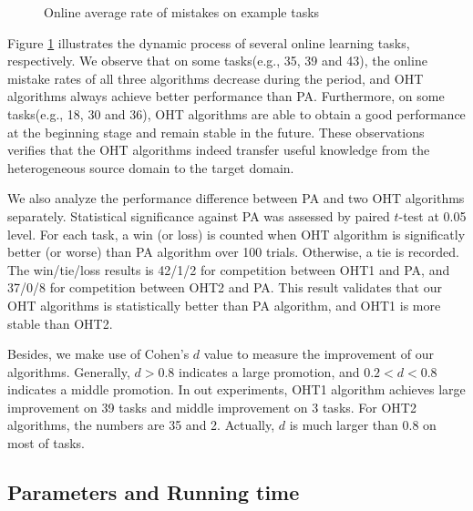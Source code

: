 \documentclass[twocolumn]{article}
\begin{document}
\begin{figure}[!htb]
\begin{center}
{  }
  \caption{Online average rate of mistakes on example tasks}
  \label{Online average rate of mistakes on example tasks}
\end{center}
\end{figure}

Figure \ref{Online average rate of mistakes on example tasks} illustrates the dynamic process of several online learning tasks, respectively.
We observe that on some tasks(e.g., 35, 39 and 43), the online mistake rates of all three algorithms decrease during the period, and OHT algorithms always achieve better performance than PA.
Furthermore, on some tasks(e.g., 18, 30 and 36), OHT algorithms are able to obtain a good performance at the beginning stage and remain stable in the future.
These observations verifies that the OHT algorithms indeed transfer useful knowledge from the heterogeneous source domain to the target domain. 

We also analyze the performance difference between PA and two OHT algorithms separately.
Statistical significance against PA was assessed by paired $t$-test at 0.05 level.
For each task, a win (or loss) is counted when OHT algorithm is significatly better (or worse) than PA algorithm over 100 trials.
Otherwise, a tie is recorded.
The win/tie/loss results is 42/1/2 for competition between OHT1 and PA, and 37/0/8 for competition between  OHT2 and PA.
This result validates that our OHT algorithms is statistically better than PA algorithm, and OHT1 is more stable than OHT2.

Besides, we make use of Cohen's $d$ value to measure the improvement of our algorithms.
Generally, $d > 0.8$ indicates a large promotion, and $0.2 < d < 0.8$ indicates a middle promotion.
In out experiments, OHT1 algorithm achieves large improvement on 39 tasks and middle improvement on 3 tasks.
For OHT2 algorithms, the numbers are 35 and 2.
Actually, $d$ is much larger than $0.8$ on most of tasks.

\subsection{Parameters and Running time}
\end{document}
